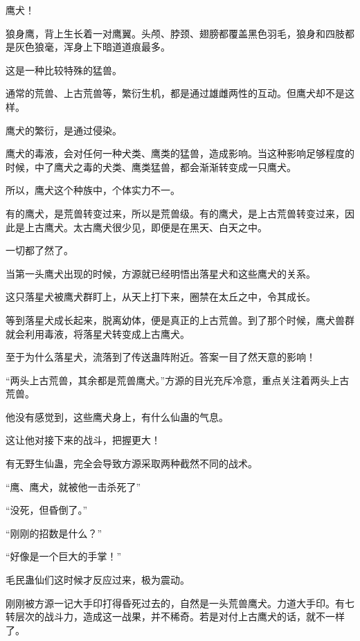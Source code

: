 
\begin{this_body}



鹰犬！

狼身鹰，背上生长着一对鹰翼。头颅、脖颈、翅膀都覆盖黑色羽毛，狼身和四肢都是灰色狼毫，浑身上下暗道道痕最多。

这是一种比较特殊的猛兽。

通常的荒兽、上古荒兽等，繁衍生机，都是通过雄雌两性的互动。但鹰犬却不是这样。

鹰犬的繁衍，是通过侵染。

鹰犬的毒液，会对任何一种犬类、鹰类的猛兽，造成影响。当这种影响足够程度的时候，中了鹰犬之毒的犬类、鹰类猛兽，都会渐渐转变成一只鹰犬。

所以，鹰犬这个种族中，个体实力不一。

有的鹰犬，是荒兽转变过来，所以是荒兽级。有的鹰犬，是上古荒兽转变过来，因此是上古鹰犬。太古鹰犬很少见，即便是在黑天、白天之中。

一切都了然了。

当第一头鹰犬出现的时候，方源就已经明悟出落星犬和这些鹰犬的关系。

这只落星犬被鹰犬群盯上，从天上打下来，圈禁在太丘之中，令其成长。

等到落星犬成长起来，脱离幼体，便是真正的上古荒兽。到了那个时候，鹰犬兽群就会利用毒液，将落星犬转变成上古鹰犬。

至于为什么落星犬，流落到了传送蛊阵附近。答案一目了然天意的影响！

“两头上古荒兽，其余都是荒兽鹰犬。”方源的目光充斥冷意，重点关注着两头上古荒兽。

他没有感觉到，这些鹰犬身上，有什么仙蛊的气息。

这让他对接下来的战斗，把握更大！

有无野生仙蛊，完全会导致方源采取两种截然不同的战术。

“鹰、鹰犬，就被他一击杀死了”

“没死，但昏倒了。”

“刚刚的招数是什么？”

“好像是一个巨大的手掌！”

毛民蛊仙们这时候才反应过来，极为震动。

刚刚被方源一记大手印打得昏死过去的，自然是一头荒兽鹰犬。力道大手印。有七转层次的战斗力，造成这一战果，并不稀奇。若是对付上古鹰犬的话，就不一样了。


\end{this_body}
